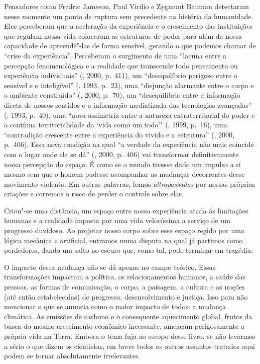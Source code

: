 Pensadores como Fredric Jameson, Paul Virilio e Zygmunt Bauman
detectaram nesse momento um ponto de ruptura sem precedente na história
da humanidade. Eles perceberam que a aceleração da experiência e o
crescimento das instituições que regulam nossa vida colocaram as
estruturas de poder para além da nossa capacidade de apreendê"-las de
forma sensível, gerando o que podemos chamar de ``crise da
experiência''. Perceberam o surgimento de uma ``lacuna entre a percepção
fenomenológica e a realidade que transcende todo pensamento ou
experiência individuais'' (, 2000, p.~411), um ``desequilíbrio
perigoso entre o sensível e o inteligível'' (, 1993, p.~23), uma
``disjunção alarmante entre o corpo e o ambiente construído'' (,
2000, p.~70), um ``desequilíbrio entre a informação direta de nossos
sentidos e a informação mediatizada das tecnologias avançadas''
(, 1993, p.~40), uma ``nova assimetria entre a natureza
extraterritorial do poder e a contínua territorialidade da `vida como um
todo'" (, 1999, p.~16), uma ``contradição crescente entre a
experiência do vivido e a estrutura'' (, 2000, p.~406). Essa nova
condição na qual ``a verdade da experiência não mais coincide com o lugar
onde ela se dá'' (, 2000, p.~406) vai transformar definitivamente
nossa percepção do espaço. É como se o mundo tivesse dado um impulso a
si mesmo sem que o homem pudesse acompanhar as mudanças decorrentes
desse movimento violento. Em outras palavras, fomos \emph{ultrapassados}
por nossas próprias criações e corremos o risco de perder o controle
sobre elas.

Criou"-se uma distância, um espaço entre nossa experiência atada às
limitações humanas e a realidade imposta por uma vida velocíssima a
serviço de um progresso duvidoso. Ao projetar nosso corpo sobre esse
espaço regido por uma lógica mecânica e artificial, entramos numa
disputa na qual já partimos como perdedores, dando um salto no escuro
que, como tal, pode terminar em tragédia.

O impacto dessa mudança não se dá apenas no campo teórico. Essas
transformações impactam a política, os relacionamentos humanos, a saúde
das pessoas, as formas de comunicação, o corpo, a paisagem, a cultura e
as noções (até então estabelecidas) de progresso, desenvolvimento e
justiça. Isso para não mencionar o que se anuncia como o maior impacto
de todos: a mudança climática. As emissões de carbono e o consequente
aquecimento global, frutos da busca do mesmo crescimento econômico
incessante, ameaçam perigosamente a própria vida na Terra. Embora o tema
fuja ao escopo desse livro, se não levarmos a sério o que dizem os
cientistas, em breve todos os outros assuntos tratados aqui podem se
tornar absolutamente irrelevantes.

